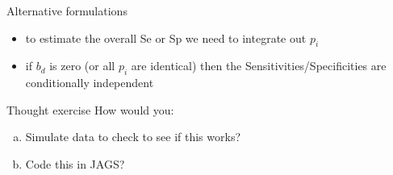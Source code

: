 \documentclass[
  ignorenonframetext,
]{beamer}
\providecommand{\tightlist}{%
  \setlength{\itemsep}{0pt}\setlength{\parskip}{0pt}}
\begin{document}
\begin{frame}{Alternative formulations}
\begin{itemize}
\begin{itemize}
    \begin{itemize}
    \tightlist
    \item
      where \(P(T_{it} = 1)\) is the probability that individual i tests
      positive to test t
    \item
      \(a_{td}\) is a parameter to estimate for each test, t and disease
      status, d (diseased or not) and can be thought of as an estimate
      of teh test sensitivity or specificity
    \item
      \(p_i\) is the propensity for individual i to test positive, and
      is \(\sim{N(0,1)}\)
    \item
      \(b_d\) is a scaling factor since we use a standardised normal
      distribution for \(p_i\)
    \item
      an alternative formulation is to replace \(b_{d}*p_i\) with
      \(p_i \simN(0, Tau_d\)
    \end{itemize}
  \item
    to estimate the overall Se or Sp we need to integrate out \(p_i\)
  \item
    if \(b_d\) is zero (or all \(p_i\) are identical) then the
    Sensitivities/Specificities are conditionally independent
  \end{itemize}
\end{itemize}

\begin{block}{Thought exercise}
\protect\hypertarget{thought-exercise}{}
How would you:

\begin{enumerate}
[a)]
\tightlist
\item
  Simulate data to check to see if this works?
\item
  Code this in JAGS?
\end{enumerate}
\end{block}
\end{frame}
\end{document}
